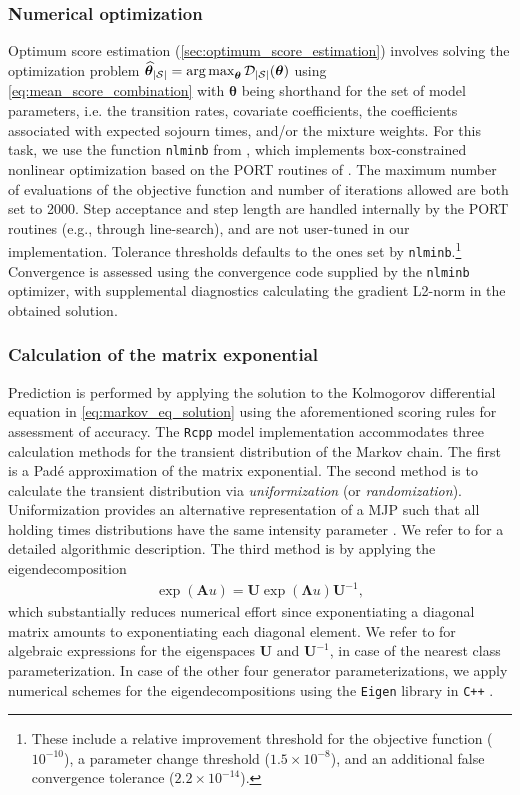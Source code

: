 \subsubsection{Numerical optimization} 
Optimum score estimation (\cref{sec:optimum_score_estimation}) involves solving the optimization problem $\widehat{\bm{\theta}}_{|\mathcal{S}|} = \operatorname*{arg\,max}_{\bm{\theta}}\mathcal{D}_{|\mathcal{S}|}(\bm{\theta})$ using \cref{eq:mean_score_combination} with $\bm{\theta}$ being shorthand for the set of model parameters, i.e. the transition rates, covariate coefficients, the coefficients associated with expected sojourn times, and/or the mixture weights.
For this task, we use the function \texttt{nlminb} from \citet{R_stats}, which implements box-constrained nonlinear optimization based on the PORT routines of \citet{Gay1990}. The maximum number of evaluations of the objective function and number of iterations allowed are both set to 2000.
Step acceptance and step length are handled internally by the PORT routines (e.g., through line-search), and are not user-tuned in our implementation.
Tolerance thresholds defaults to the ones set by \texttt{nlminb}.\footnote{These include a relative improvement threshold for the objective function ($10^{-10}$), a parameter change threshold ($1.5 \times 10^{-8}$), and an additional false convergence tolerance ($2.2\times 10^{-14}$).}
Convergence is assessed using the convergence code supplied by the \texttt{nlminb} optimizer, with supplemental diagnostics calculating the gradient L2-norm in the obtained solution.




\subsubsection{Calculation of the matrix exponential} Prediction is performed by applying the solution to the Kolmogorov differential equation in \cref{eq:markov_eq_solution} using the aforementioned scoring rules for assessment of accuracy.
The \texttt{Rcpp} model implementation accommodates three calculation methods for the transient distribution of the Markov chain. The first is a Padé approximation of the matrix exponential. The second method is to calculate the transient distribution via \textit{uniformization} (or \textit{randomization}). Uniformization provides an alternative representation of a MJP such that all holding times distributions have the same intensity parameter \citep[Section 1.3.4]{bladt_nielsen}. We refer to \citet{sherlock2021a} for a detailed algorithmic description. The third method is by applying the eigendecomposition
\begin{align*}
    \exp{\left( \bm{A}u \right) } = \bm{U}  \exp{\left( \bm{\Lambda}u \right) } \bm{U}^{-1}, 
\end{align*}
which substantially reduces numerical effort since exponentiating a diagonal matrix amounts to exponentiating each diagonal element.
We refer to \citet{bisgaard2024A} for algebraic expressions for the eigenspaces $\bm{U}$ and $\bm{U}^{-1}$, in case of the nearest class parameterization. In case of the other four generator parameterizations, we apply numerical schemes for the eigendecompositions using the \texttt{Eigen} library in \texttt{C++} \citep{eigenweb}.

